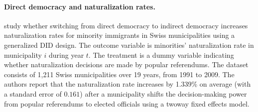 \documentclass[12pt]{article}
\begin{document}
\paragraph{Direct democracy and naturalization rates.} \citet{hainmueller2015does} study whether switching from direct democracy to indirect democracy increases naturalization rates for minority immigrants in Swiss municipalities using a generalized DID design. The outcome variable is minorities' naturalization rate in municipality $i$ during year $t$.  The treatment is a dummy variable indicating whether naturalization decisions are made by popular referendums. The dataset consists of 1,211 Swiss municipalities over 19 years, from 1991 to 2009. The authors report that the naturalization rate increases by  1.339\% on average (with a standard error of $0.161$) after a municipality shifts the decision-making power from popular referendums to elected officials using a twoway fixed effects model. 
\end{document}
